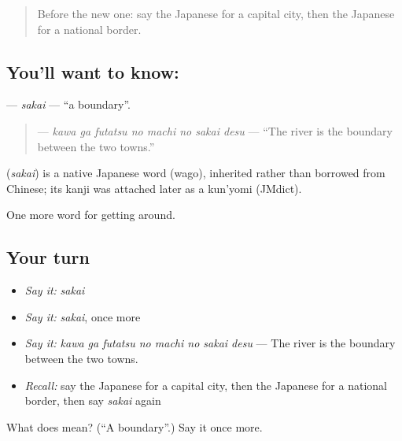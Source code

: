 \begin{quote}
Before the new one: say the Japanese for a capital city, then the Japanese for a national border.
\end{quote}

\subsection*{You'll want to know: }
\textbf{} — \emph{sakai} — \textquotedblleft{}a boundary\textquotedblright{}.

\begin{quote}
\textbf{   } — \emph{kawa ga futatsu no machi no sakai desu} — \textquotedblleft{}The river is the boundary between the two towns.\textquotedblright{}
\end{quote}

\begin{cousinweb}
\textbf{} (\emph{sakai}) is a native Japanese word (wago), inherited rather than borrowed from Chinese; its kanji was attached later as a kun'yomi (JMdict).
\end{cousinweb}

\begin{grammarlens}[title={What you've built}]
One more word for getting around.
\end{grammarlens}

\subsection*{Your turn}
\begin{itemize}
\raggedright
  \item \emph{Say it:} \emph{sakai}
  \item \emph{Say it:} \emph{sakai}, once more
  \item \emph{Say it:} \emph{kawa ga futatsu no machi no sakai desu} — The river is the boundary between the two towns.
  \item \emph{Recall:} say the Japanese for a capital city, then the Japanese for a national border, then say \emph{sakai} again
\end{itemize}

\begin{tcolorbox}[breakable,colback=teal!4,colframe=teal!35!black,title={Before you move on}]
What does  mean? (\textquotedblleft{}A boundary\textquotedblright{}.) Say it once more.
\end{tcolorbox}
